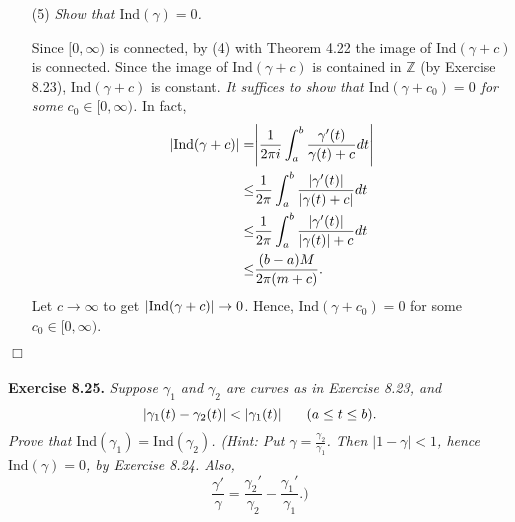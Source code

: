\documentclass{article}
\begin{document}
\begin{enumerate}
\item[(5)]
  \emph{Show that $\mathrm{Ind}(\gamma) = 0$.}

  Since $[0,\infty)$ is connected, by (4) with Theorem 4.22
  the image of $\mathrm{Ind}(\gamma+c)$ is connected.
  Since the image of $\mathrm{Ind}(\gamma+c)$ is contained in $\mathbb{Z}$ (by Exercise 8.23),
  $\mathrm{Ind}(\gamma+c)$ is constant.
  \emph{It suffices to show that $\mathrm{Ind}(\gamma+c_0) = 0$ for some $c_0 \in [0,\infty)$.}
  In fact,
  \begin{align*}
    \abs{ \mathrm{Ind}(\gamma+c) }
    =& \abs{ \frac{1}{2\pi i}\int_{a}^{b} \frac{\gamma'(t)}{\gamma(t)+c} dt } \\
    \leq& \frac{1}{2\pi} \int_{a}^{b} \frac{|\gamma'(t)|}{|\gamma(t)+c|} dt \\
    \leq& \frac{1}{2\pi} \int_{a}^{b} \frac{|\gamma'(t)|}{|\gamma(t)|+c} dt \\
    \leq& \frac{(b-a)M}{2\pi(m+c)}.
  \end{align*}
  Let $c \to \infty$ to get $\abs{ \mathrm{Ind}(\gamma+c) } \to 0$.
  Hence, $\mathrm{Ind}(\gamma+c_0) = 0$ for some $c_0 \in [0,\infty)$.
\end{enumerate}
$\Box$ \\\\






\textbf{Exercise 8.25.}
\emph{Suppose $\gamma_1$ and $\gamma_2$ are curves as in Exercise 8.23,
and
\[
  \abs{ \gamma_1(t) - \gamma_2(t) } < \abs{ \gamma_1(t) }
  \:\:\:\:\:\:\:\: (a \leq t \leq b).
\]
Prove that $\mathrm{Ind}(\gamma_1) = \mathrm{Ind}(\gamma_2)$.
(Hint: Put $\gamma = \frac{\gamma_2}{\gamma_1}$.
Then $|1-\gamma| < 1$, hence $\mathrm{Ind}(\gamma) = 0$, by Exercise 8.24.
Also,
\[
  \frac{\gamma'}{\gamma} = \frac{\gamma_2'}{\gamma_2} - \frac{\gamma_1'}{\gamma_1}.)
\]} \\
\end{document}
